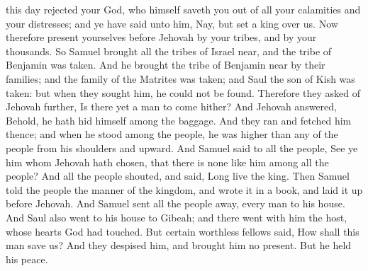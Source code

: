 this day rejected your God, who himself saveth you out of all your calamities and your distresses; and ye have said unto him, Nay, but set a king over us. Now therefore present yourselves before Jehovah by your tribes, and by your thousands. So Samuel brought all the tribes of Israel near, and the tribe of Benjamin was taken. And he brought the tribe of Benjamin near by their families; and the family of the Matrites was taken; and Saul the son of Kish was taken: but when they sought him, he could not be found. Therefore they asked of Jehovah further, Is there yet a man to come hither? And Jehovah answered, Behold, he hath hid himself among the baggage. And they ran and fetched him thence; and when he stood among the people, he was higher than any of the people from his shoulders and upward. And Samuel said to all the people, See ye him whom Jehovah hath chosen, that there is none like him among all the people? And all the people shouted, and said, Long live the king.  Then Samuel told the people the manner of the kingdom, and wrote it in a book, and laid it up before Jehovah. And Samuel sent all the people away, every man to his house. And Saul also went to his house to Gibeah; and there went with him the host, whose hearts God had touched. But certain worthless fellows said, How shall this man save us? And they despised him, and brought him no present. But he held his peace. 


